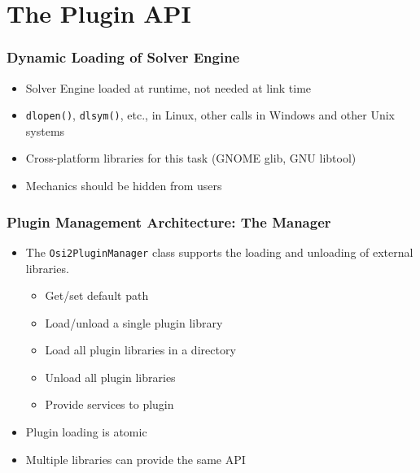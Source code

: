 \documentclass{beamer}
\begin{document}
\section{The Plugin API}

\begin{frame}
  \frametitle{Dynamic Loading of Solver Engine}
  \begin{itemize}
  \item Solver Engine loaded at runtime, not needed at link time
  \item \lstinline|dlopen()|, \lstinline|dlsym()|, etc., in Linux, other
    calls in Windows and other Unix systems
  \item Cross-platform libraries for this task (GNOME glib, GNU
    libtool)
  \item Mechanics should be hidden from users
  \end{itemize}
\end{frame}

\begin{frame}
  \frametitle{Plugin Management Architecture: The Manager}
  \begin{itemize}
  \item The \lstinline|Osi2PluginManager| class supports
    the loading and unloading of external libraries.
    \begin{itemize}
    \item Get/set default path
    \item Load/unload a single plugin library
    \item Load all plugin libraries in a directory
    \item Unload all plugin libraries
    \item Provide services to plugin
    \end{itemize}
  \item Plugin loading is atomic
  \item Multiple libraries can provide the same API
  \end{itemize}
\end{frame}
\end{document}
